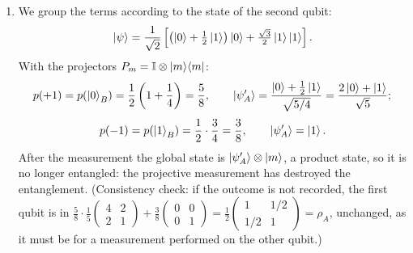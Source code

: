 \documentclass[11pt,a4paper]{article}
\newcommand{\id}{\mathbb{I}}
\begin{document}
\begin{enumerate}
\item We group the terms according to the state of the second qubit:
\[
\ket\psi=\frac1{\sqrt2}\left[\left(\ket0+\tfrac12\ket1\right)\ket0+\tfrac{\sqrt3}2\ket1\ket1\right].
\]
With the projectors $P_m=\id\otimes\ket m\!\bra m$:
\[
p(+1)=p(\ket0_B)=\frac12\left(1+\frac14\right)=\frac58,\qquad
\ket{\psi'_A}=\frac{\ket0+\frac12\ket1}{\sqrt{5/4}}=\frac{2\ket0+\ket1}{\sqrt5};
\]
\[
p(-1)=p(\ket1_B)=\frac12\cdot\frac34=\frac38,\qquad \ket{\psi'_A}=\ket1 .
\]
After the measurement the global state is $\ket{\psi'_A}\otimes\ket m$, a product state, so it is
no longer entangled: the projective measurement has destroyed the entanglement.
(Consistency check: if the outcome is not recorded, the first qubit is in
$\frac58\cdot\frac15\begin{pmatrix}4&2\\2&1\end{pmatrix}+\frac38\begin{pmatrix}0&0\\0&1\end{pmatrix}=\frac12\begin{pmatrix}1&1/2\\1/2&1\end{pmatrix}=\rho_A$,
unchanged, as it must be for a measurement performed on the other qubit.)
\end{enumerate}
\end{document}
